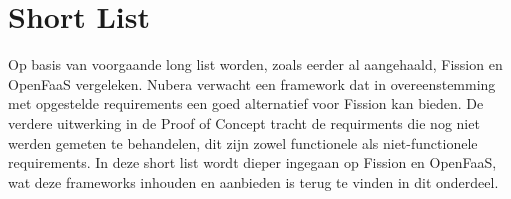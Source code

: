 \begin{table}[]
    \centering
    \caption{Frameworks opgelijst in graad waarin ze in aanmerking komen. (M-H: Must-have, S-H: Should-have, N-T-H: Nice to have.) }
    \label{tab:frameworks-samenvattingl}
\end{table}

\section{Short List}
\label{sec:short-list}
Op basis van voorgaande long list worden, zoals eerder al aangehaald, Fission en OpenFaaS vergeleken. Nubera verwacht een framework dat in overeenstemming met opgestelde requirements een goed alternatief voor Fission kan bieden. De verdere uitwerking in de Proof of Concept tracht de requirments die nog niet werden gemeten te behandelen, dit zijn zowel functionele als niet-functionele requirements. In deze short list wordt dieper ingegaan op Fission en OpenFaaS, wat deze frameworks inhouden en aanbieden is terug te vinden in dit onderdeel.

